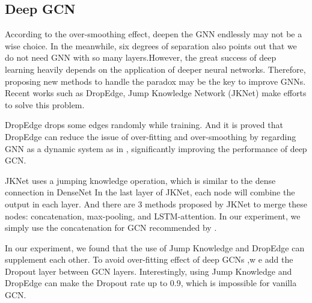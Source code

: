 \documentclass[fleqn,10pt]{SelfArx} %
\begin{document}
\begin{table}
	\centering
	\caption{Node classification with shallow GCNs}
	\label{node-cls-cs}
\end{table}


\subsection{Deep GCN}

According to the over-smoothing effect, deepen the GNN endlessly may not be a wise  choice. In the meanwhile, six degrees of separation also points out that we do not need GNN with so many layers.However, the great success of deep learning heavily depends on the application of deeper neural networks. Therefore, proposing new methods to handle the paradox may be the key to improve GNNs. Recent works such as DropEdge\cite{rong2019dropedge}, Jump Knowledge Network (JKNet) \cite{xu2018representation} make efforts to solve this problem.

DropEdge\cite{rong2019dropedge} drops some edges randomly while training. And it is proved that DropEdge can reduce 
the issue of over-fitting and over-smoothing by regarding GNN as a dynamic system as in \cite{oono2019asymptotic}, significantly improving the performance of deep GCN.

JKNet\cite{xu2018representation} uses a jumping knowledge operation, which is similar to the dense connection in DenseNet\cite{huang2017densely} 
In the last layer of JKNet, each node will combine the output in each layer. And there are 3 methods proposed by JKNet to merge these nodes: concatenation, max-pooling, and LSTM-attention. In our experiment, we simply use the concatenation for GCN recommended by \cite{xu2018representation}.

In our experiment, we found that the use of Jump Knowledge and DropEdge can supplement each other. To avoid over-fitting effect of deep GCNs ,w e add the Dropout layer between GCN layers. Interestingly, using 
Jump Knowledge and DropEdge can make the Dropout rate up to 0.9, which is impossible for vanilla GCN.
\end{document}
